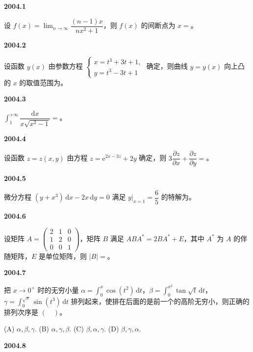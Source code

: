\documentclass[UTF8,12pt,fontset=windows]{ctexart}
\begin{document}
{\large\bfseries 2004.1}

设 $f(x)=\lim_{n\to\infty}\dfrac{(n-1)x}{nx^2+1}$，则 $f(x)$ 的间断点为 $x=$\underline{\hspace{20mm}}。

\vfill
\newpage
{\large\bfseries 2004.2}

设函数 $y(x)$ 由参数方程 $\begin{cases}x=t^3+3t+1,\\ y=t^3-3t+1\end{cases}$ 确定，则曲线 $y=y(x)$ 向上凸的 $x$ 的取值范围为\underline{\hspace{20mm}}。

\vfill
\newpage
{\large\bfseries 2004.3}

$\displaystyle\int_1^{+\infty}\dfrac{\mathrm{d}x}{x\sqrt{x^2-1}}=$\underline{\hspace{20mm}}。

\vfill
\newpage
{\large\bfseries 2004.4}

设函数 $z=z(x,y)$ 由方程 $z=\mathrm{e}^{2x-3z}+2y$ 确定，则 $3\dfrac{\partial z}{\partial x}+\dfrac{\partial z}{\partial y}=$\underline{\hspace{20mm}}。

\vfill
\newpage
{\large\bfseries 2004.5}

微分方程 $(y+x^3)\,\mathrm{d}x-2x\,\mathrm{d}y=0$ 满足 $y\big|_{x=1}=\dfrac{6}{5}$ 的特解为\underline{\hspace{20mm}}。

\vfill
\newpage
{\large\bfseries 2004.6}

设矩阵 $A=\begin{pmatrix}2&1&0\\1&2&0\\0&0&1\end{pmatrix}$，矩阵 $B$ 满足 $ABA^*=2BA^*+E$，其中 $A^*$ 为 $A$ 的伴随矩阵，$E$ 是单位矩阵，则 $|B|=$\underline{\hspace{20mm}}。

\vfill
\newpage
{\large\bfseries 2004.7}

把 $x\to0^+$ 时的无穷小量 $\alpha=\displaystyle\int_0^x\cos(t^2)\,\mathrm{d}t$，$\beta=\displaystyle\int_0^{x^2}\tan\sqrt{t}\,\mathrm{d}t$，$\gamma=\displaystyle\int_0^{\sqrt{x}}\sin(t^3)\,\mathrm{d}t$ 排列起来，使排在后面的是前一个的高阶无穷小，则正确的排列次序是 $(\quad)$。

(A) $\alpha,\beta,\gamma$.  (B) $\alpha,\gamma,\beta$.  (C) $\beta,\alpha,\gamma$.  (D) $\beta,\gamma,\alpha$.

\vfill
\newpage
{\large\bfseries 2004.8}
\end{document}
